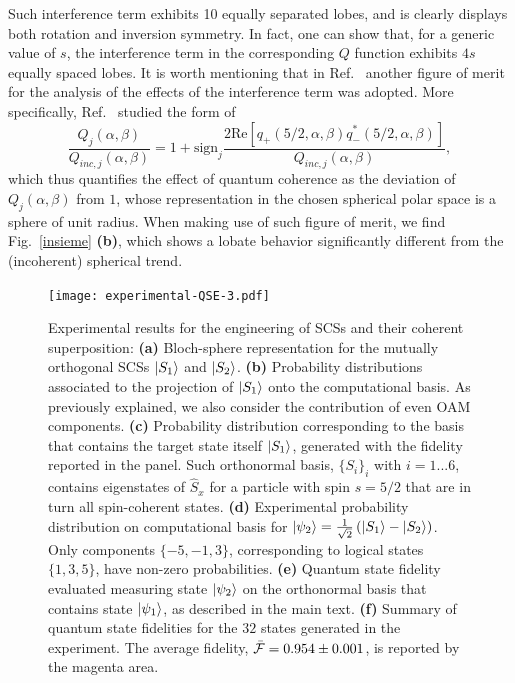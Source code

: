 Such interference term exhibits 10 equally separated lobes, and is clearly displays both rotation and inversion symmetry. In fact, one can show that, for a generic value of $s$, the interference term in the corresponding $Q$ function exhibits $4s$ equally spaced lobes. It is worth mentioning that in Ref.~\cite{agarwal1997atomic} another figure of merit for the analysis of the effects of the interference term was adopted. More specifically, Ref.~\cite{agarwal1997atomic} studied the form of 
\begin{equation}
\frac{Q_j(\alpha,\beta)}{Q_{inc,j}(\alpha,\beta)}=1+\text{sign}_j\frac{2\text{Re}[q_+(5/2,\alpha,\beta)q^*_-(5/2,\alpha,\beta)]}{Q_{inc,j}(\alpha,\beta)},
\end{equation}
which thus quantifies the effect of quantum coherence as the deviation of $Q_j(\alpha,\beta)$ from $1$, whose representation in the chosen spherical polar space is a sphere of unit radius. When making use of such figure of merit, we find Fig.~\ref{insieme} {\bf (b)}, which shows a lobate behavior significantly different from the (incoherent) spherical trend. 

\begin{figure}[tb]
\texttt{[image: experimental-QSE-3.pdf]}
\caption{
	Experimental results for the engineering of \acp{SCS} and their coherent superposition:
	\textbf{(a)} Bloch-sphere representation for the mutually orthogonal \acp{SCS} $\ket{S_1}$ and $\ket{S_2}$.
	\textbf{(b)} Probability distributions associated to the projection of $\ket{S_1}$ onto the computational basis. As previously explained, we also consider the contribution of even \ac{OAM} components.
	\textbf{(c)} Probability distribution corresponding to the basis that contains the target state itself $\ket{S_1}$, generated with the fidelity reported in the panel. Such orthonormal basis, $\{S_i\}_i$ with $i=1 ...6$, contains eigenstates of $\hat{S}_x$ for a particle with spin $s=5/2$ that are in turn all spin-coherent states.
	\textbf{(d)} Experimental probability distribution on computational basis for $\ket{\psi_2}=\frac{1}{\sqrt{2}}\left(\ket{S_1}- \ket{S_2} \right)$. Only components $\{-5, -1, 3\}$, corresponding to logical states $\{1,3,5\}$, have non-zero probabilities.
	\textbf{(e)} Quantum state fidelity evaluated measuring state $\ket{\psi_2}$ on the orthonormal basis that contains state $\ket{\psi_1}$, as described in the main text. 
	\textbf{(f)} Summary of quantum state fidelities for the $32$ states generated in the experiment. The average fidelity, $\bar{{\mathcal{F}}}=0.954\pm 0.001$, is reported by the magenta area.
}
\label{fig:VVBs:figSpin}
\end{figure}

